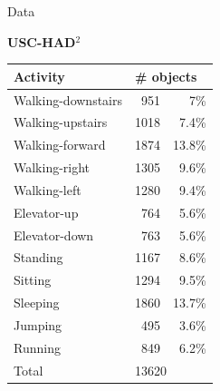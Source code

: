 \documentclass{beamer}
\begin{document}
\begin{frame}{Data}
\begin{minipage}[t]{0.02\columnwidth}
\begin{figure}[h]
	\end{figure}
\end{minipage}
\hfill
\begin{minipage}[t]{0.47\linewidth}
	\textbf{USC-HAD}$^2$
	\begin{table}[]
		\scriptsize
		\label{my-label}
		\begin{tabular}{l|rr}
			\hline
			\textbf{Activity} & \multicolumn{2}{l}{\textbf{\# objects}} \\ \hline
			Walking-downstairs & 951 & 7\%  \\
			Walking-upstairs        & 1018&7.4\%  \\
			Walking-forward    & 1874&13.8\% \\
			Walking-right        & 1305&9.6\%  \\
			Walking-left        & 1280&9.4\%  \\
			Elevator-up        & 764&5.6\% \\
			Elevator-down        & 763&5.6\%  \\
			Standing           & 1167&8.6\%  \\
			Sitting            & 1294&9.5\%  \\
			Sleeping           & 1860&13.7\% \\
			Jumping        & 495&3.6\%  \\
			Running            & 849&6.2\%  \\ \hline 
			Total              & \multicolumn{2}{l}{13620}\\ 
			\hline
		\end{tabular}
	\end{table}
\end{minipage}
\hspace{-0.24cm}
\begin{minipage}[t]{0.02\columnwidth}
	\vspace{0.78cm}
	\begin{figure}[h]
		\centering

\end{figure}
\end{minipage}
\end{frame}
\end{document}
